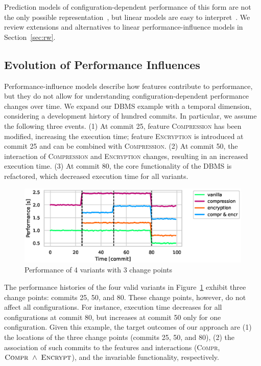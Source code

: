 \documentclass[sigconf]{acmart}
\begin{document}
	Prediction models of configuration-dependent performance of this form are not the only possible representation~\cite{guoVariabilityawarePerformancePrediction2013,haDeepPerf2019}, but linear models are easy to interpret~\cite{siegmundPerformanceinfluenceModelsHighly2015}.
	We review extensions and alternatives to linear performance-influence models in Section~\ref{sec:rw}.
	
	\subsection{Evolution of Performance Influences}
	Performance-influence models describe how features contribute to performance, but they do not allow for understanding configuration-dependent performance changes over time.
	We expand our DBMS example with a temporal dimension, considering a development history of hundred commits.
	In particular, we assume the following three events. (1) At commit 25, feature \textsc{Compression} has been modified, increasing the execution time; feature \textsc{Encryption} is introduced at commit 25 and can be combined with \textsc{Compression}. (2) At commit 50, the interaction of \textsc{Compression} and \textsc{Encryption} changes, resulting in an increased execution time. (3) At commit 80, the core functionality of the DBMS is refactored, which decreased execution time for all variants.
	\begin{figure}[ht!]
		\centering
		\includegraphics[width=\linewidth]{images/dbms_performance.eps}
		\caption{Performance of 4 variants with 3 change points}
		\label{fig:dbms_performance}
	\end{figure}
	
	The performance histories of the four valid variants in Figure~\ref{fig:dbms_performance} exhibit three change points: commits 25, 50, and 80. These change points, however, do not affect all configurations.
	For  instance, execution time decreases for all configurations at commit 80, but increases at commit 50 only for one configuration.
	Given this example, the target outcomes of our approach are (1) the locations of the three change points (commits 25, 50, and 80),  (2) the association of such commits to the features and interactions (\textsc{Compr}, $\text{\textsc{Compr}}\ \land\ \text{\textsc{Encrypt}}$), and the invariable functionality, respectively.
	
\end{document}
